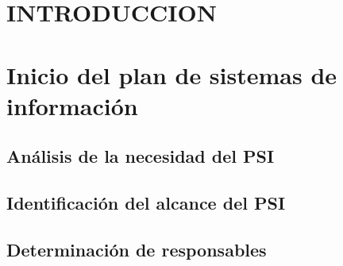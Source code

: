 \documentclass[12pt,a4paper,titlepage,spanish,twoside]{book}
\begin{document}
\section{INTRODUCCION}

\section{Inicio del plan de sistemas de información}
\subsection{Análisis de la necesidad del PSI}
\subsection{Identificación del alcance del PSI}
\subsection{Determinación de responsables}
\end{document}
